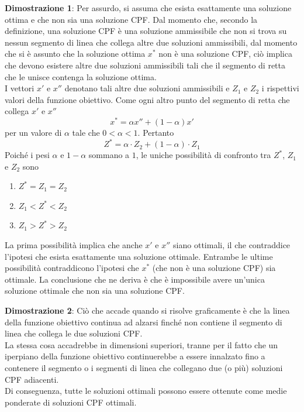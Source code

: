 \documentclass[a4paper]{extarticle}
\begin{document}
\vspace{1em}
\noindent
\textbf{Dimostrazione 1}: Per assurdo, si assuma che esista esattamente una soluzione ottima e che non sia una soluzione CPF. Dal momento che, secondo la definizione, una soluzione CPF è una soluzione ammissibile che non si trova su nessun segmento di linea che collega altre due soluzioni ammissibili, dal momento che si è assunto che la soluzione ottima $x^*$ non è una soluzione CPF, ciò implica che devono esistere altre due soluzioni ammissibili tali che il segmento di retta che le unisce contenga la soluzione ottima.\\
I vettori $x'$ e $x''$ denotano tali altre due soluzioni ammissibili e $Z_1$ e $Z_2$ i rispettivi valori della funzione obiettivo. Come ogni altro punto del segmento di retta che collega $x'$ e $x''$
\[x^* = \alpha x'' + (1-\alpha) x'\]
per un valore di $\alpha$ tale che $0 < \alpha < 1$. Pertanto
\[Z^* = \alpha \cdot Z_2 + (1 - \alpha) \cdot Z_1\]
Poiché i pesi $\alpha$ e $1 - \alpha$ sommano a $1$, le uniche possibilità di confronto tra $Z^*$, $Z_1$ e $Z_2$ sono
\begin{enumerate}
    \item $Z^* = Z_1 = Z_2$
    \item $Z_1 < Z^* < Z_2$
    \item $Z_1 > Z^* > Z_2$
\end{enumerate}
La prima possibilità implica che anche $x'$ e $x''$ siano ottimali, il che contraddice l'ipotesi che esista esattamente una soluzione ottimale. Entrambe le ultime possibilità contraddicono l'ipotesi che $x^*$ (che non è una soluzione CPF) sia ottimale. La conclusione che ne deriva è che è impossibile avere un'unica soluzione ottimale che non sia una soluzione CPF.

\vspace{1em}
\noindent
\textbf{Dimostrazione 2}: Ciò che accade quando si risolve graficamente è che la linea della funzione obiettivo continua ad alzarsi finché non contiene il segmento di linea che collega le due soluzioni CPF.\\
La stessa cosa accadrebbe in dimensioni superiori, tranne per il fatto che un iperpiano della funzione obiettivo continuerebbe a essere innalzato fino a contenere il segmento o i segmenti di linea che collegano due (o più) soluzioni CPF adiacenti.\\
Di conseguenza, tutte le soluzioni ottimali possono essere ottenute come medie ponderate di soluzioni CPF ottimali.

\vspace{1em}
\end{document}
